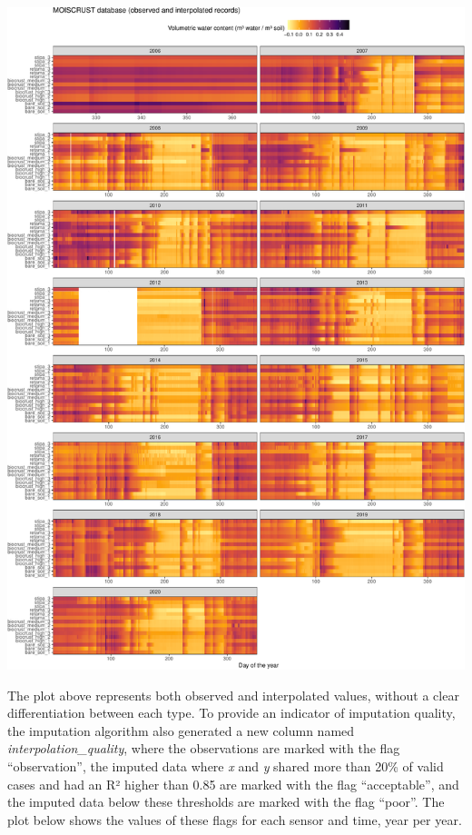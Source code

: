 \documentclass[
  table]{article}
\begin{document}
\includegraphics{moiscrust_files/figure-latex/unnamed-chunk-28-1.pdf}

The plot above represents both observed and interpolated values, without
a clear differentiation between each type. To provide an indicator of
imputation quality, the imputation algorithm also generated a new column
named \emph{interpolation\_quality}, where the observations are marked
with the flag ``observation'', the imputed data where \emph{x} and
\emph{y} shared more than 20\% of valid cases and had an R² higher than
0.85 are marked with the flag ``acceptable'', and the imputed data below
these thresholds are marked with the flag ``poor''. The plot below shows
the values of these flags for each sensor and time, year per year.
\end{document}
